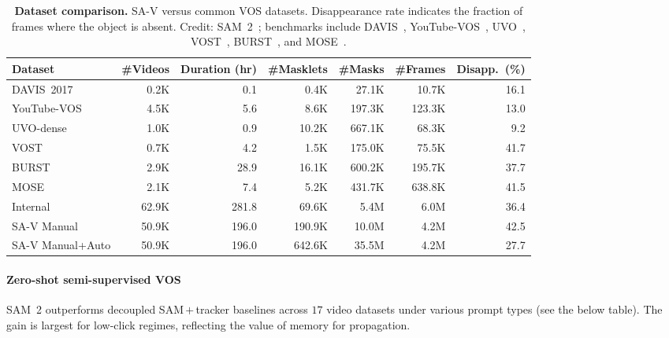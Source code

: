 \begin{enrichment}
\begin{enrichment}
		\begin{table}[H]
			\centering
			\scriptsize
			\caption{\textbf{Dataset comparison.} SA-V versus common VOS datasets. Disappearance rate indicates the fraction of frames where the object is absent. Credit: SAM~2~\cite{ravi2024_sam2}; benchmarks include DAVIS~\cite{ponttuset2017_davis}, YouTube-VOS~\cite{xu2018_youtubevos}, UVO~\cite{wang2021_uvo}, VOST~\cite{tokmakov2022_vost}, BURST~\cite{athar2023_burst}, and MOSE~\cite{ding2023_mose}.}
			\label{tab:chapter15_sam2_dataset_compare}
			\begin{tabular}{lrrrrrr}
				\toprule
				\textbf{Dataset} & \textbf{\#Videos} & \textbf{Duration (hr)} & \textbf{\#Masklets} & \textbf{\#Masks} & \textbf{\#Frames} & \textbf{Disapp.\ (\%)} \\
				\midrule
				DAVIS~2017 & 0.2K & 0.1 & 0.4K & 27.1K & 10.7K & 16.1 \\
				YouTube-VOS & 4.5K & 5.6 & 8.6K & 197.3K & 123.3K & 13.0 \\
				UVO-dense & 1.0K & 0.9 & 10.2K & 667.1K & 68.3K & 9.2 \\
				VOST & 0.7K & 4.2 & 1.5K & 175.0K & 75.5K & 41.7 \\
				BURST & 2.9K & 28.9 & 16.1K & 600.2K & 195.7K & 37.7 \\
				MOSE & 2.1K & 7.4 & 5.2K & 431.7K & 638.8K & 41.5 \\
				Internal & 62.9K & 281.8 & 69.6K & 5.4M & 6.0M & 36.4 \\
				SA-V Manual & 50.9K & 196.0 & 190.9K & 10.0M & 4.2M & 42.5 \\
				SA-V Manual+Auto & 50.9K & 196.0 & 642.6K & 35.5M & 4.2M & 27.7 \\
				\bottomrule
			\end{tabular}
		\end{table}
		
		\paragraph{Zero-shot semi-supervised VOS}
		SAM~2 outperforms decoupled SAM\,$+$\,tracker baselines across $17$ video datasets under various prompt types (see the below table). The gain is largest for low-click regimes, reflecting the value of memory for propagation.
		

\end{enrichment}
\end{enrichment}
